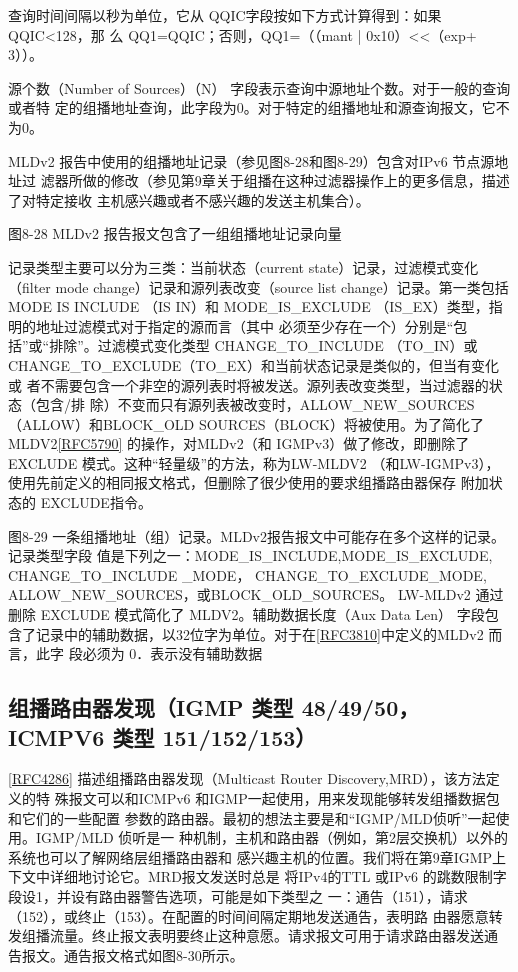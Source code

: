 查询时间间隔以秒为单位，它从 QQIC字段按如下方式计算得到：如果QQIC<128，那
么 QQ1=QQIC；否则，QQ1=（（mant | 0x10）<<（exp+ 3））。

源个数（Number of Sources）（N） 字段表示查询中源地址个数。对于一般的查询或者特
定的组播地址查询，此字段为0。对于特定的组播地址和源查询报文，它不为0。

MLDv2 报告中使用的组播地址记录（参见图8-28和图8-29）包含对IPv6 节点源地址过
滤器所做的修改（参见第9章关于组播在这种过滤器操作上的更多信息，描述了对特定接收
主机感兴趣或者不感兴趣的发送主机集合）。

图8-28 MLDv2 报告报文包含了一组组播地址记录向量

记录类型主要可以分为三类：当前状态（current state）记录，过滤模式变化（filter mode
change）记录和源列表改变（source list change）记录。第一类包括 MODE IS INCLUDE （IS
IN）和 MODE\_IS\_EXCLUDE （IS\_EX）类型，指明的地址过滤模式对于指定的源而言（其中
必须至少存在一个）分别是“包括”或“排除”。过滤模式变化类型 CHANGE\_TO\_INCLUDE
（TO\_IN）或CHANGE\_TO\_EXCLUDE（TO\_EX）和当前状态记录是类似的，但当有变化或
者不需要包含一个非空的源列表时将被发送。源列表改变类型，当过滤器的状态（包含/排
除）不变而只有源列表被改变时，ALLOW\_NEW\_SOURCES（ALLOW）和BLOCK\_OLD
SOURCES（BLOCK）将被使用。为了简化了MLDV2\href{https://www.rfc-editor.org/rfc/rfc5790}{[RFC5790]} 的操作，对MLDv2（和
IGMPv3）做了修改，即删除了 EXCLUDE 模式。这种“轻量级”的方法，称为LW-MLDV2
（和LW-IGMPv3），使用先前定义的相同报文格式，但删除了很少使用的要求组播路由器保存
附加状态的 EXCLUDE指令。

图8-29 一条组播地址（组）记录。MLDv2报告报文中可能存在多个这样的记录。记录类型字段
值是下列之一：MODE\_IS\_INCLUDE,MODE\_IS\_EXCLUDE, CHANGE\_TO\_INCLUDE \_MODE，
CHANGE\_TO\_EXCLUDE\_MODE, ALLOW\_NEW\_SOURCES，或BLOCK\_OLD\_SOURCES。
LW-MLDv2 通过删除 EXCLUDE 模式简化了 MLDV2。辅助数据长度（Aux Data Len） 字段包
含了记录中的辅助数据，以32位字为单位。对于在\href{https://www.rfc-editor.org/rfc/rfc3810}{[RFC3810]}中定义的MLDv2 而言，此字
段必须为 0．表示没有辅助数据

\subsection{组播路由器发现（IGMP 类型 48/49/50，ICMPV6 类型 151/152/153）}
\href{https://www.rfc-editor.org/rfc/rfc4286}{[RFC4286]} 描述组播路由器发现（Multicast Router Discovery,MRD），该方法定义的特
殊报文可以和ICMPv6 和IGMP一起使用，用来发现能够转发组播数据包和它们的一些配置
参数的路由器。最初的想法主要是和“IGMP/MLD侦听”一起使用。IGMP/MLD 侦听是一
种机制，主机和路由器（例如，第2层交换机）以外的系统也可以了解网络层组播路由器和
感兴趣主机的位置。我们将在第9章IGMP上下文中详细地讨论它。MRD报文发送时总是
将IPv4的TTL 或IPv6 的跳数限制字段设1，并设有路由器警告选项，可能是如下类型之
一：通告（151），请求（152），或终止（153）。在配置的时间间隔定期地发送通告，表明路
由器愿意转发组播流量。终止报文表明要终止这种意愿。请求报文可用于请求路由器发送通
告报文。通告报文格式如图8-30所示。


